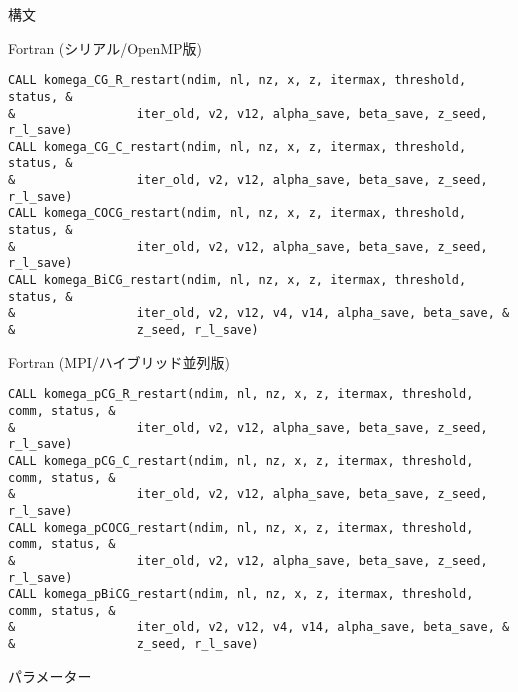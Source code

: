 \documentclass[12pt,titlepage]{jarticle}
\begin{document}
  \noindent 構文
  
  \noindent Fortran (シリアル/OpenMP版)
  
\begin{verbatim}
CALL komega_CG_R_restart(ndim, nl, nz, x, z, itermax, threshold, status, &
&                 iter_old, v2, v12, alpha_save, beta_save, z_seed, r_l_save)
CALL komega_CG_C_restart(ndim, nl, nz, x, z, itermax, threshold, status, &
&                 iter_old, v2, v12, alpha_save, beta_save, z_seed, r_l_save)
CALL komega_COCG_restart(ndim, nl, nz, x, z, itermax, threshold, status, &
&                 iter_old, v2, v12, alpha_save, beta_save, z_seed, r_l_save)
CALL komega_BiCG_restart(ndim, nl, nz, x, z, itermax, threshold, status, &
&                 iter_old, v2, v12, v4, v14, alpha_save, beta_save, &
&                 z_seed, r_l_save)
\end{verbatim}

  \noindent Fortran (MPI/ハイブリッド並列版)
  
\begin{verbatim}
CALL komega_pCG_R_restart(ndim, nl, nz, x, z, itermax, threshold, comm, status, &
&                 iter_old, v2, v12, alpha_save, beta_save, z_seed, r_l_save)
CALL komega_pCG_C_restart(ndim, nl, nz, x, z, itermax, threshold, comm, status, &
&                 iter_old, v2, v12, alpha_save, beta_save, z_seed, r_l_save)
CALL komega_pCOCG_restart(ndim, nl, nz, x, z, itermax, threshold, comm, status, &
&                 iter_old, v2, v12, alpha_save, beta_save, z_seed, r_l_save)
CALL komega_pBiCG_restart(ndim, nl, nz, x, z, itermax, threshold, comm, status, &
&                 iter_old, v2, v12, v4, v14, alpha_save, beta_save, &
&                 z_seed, r_l_save)
\end{verbatim}

\noindent パラメーター
\end{document}
